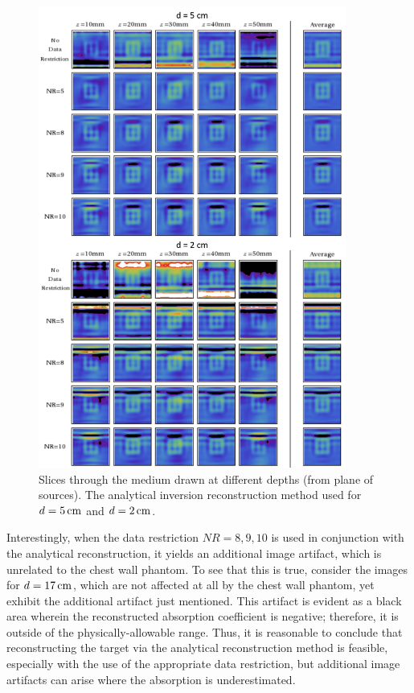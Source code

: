 \begin{figure}[htbp]
\centering
\includegraphics[width=0.9\textwidth]{./figures/3_Chestwall/anaslices.png}
\caption[Analytical reconstruction images at various depths]{\label{fig:slices_analytical}
Slices through the medium drawn at different depths (from plane of sources). The analytical inversion reconstruction method used for $d=5\,\rm{cm}$ and $d=2\,\rm{cm}$.}
\end{figure}
Interestingly, when the data restriction $NR = 8, 9, 10$ is used in conjunction with the analytical reconstruction, it yields an additional image artifact, which is unrelated to the chest wall phantom. To see that this is true, consider the images for $d=17\,{\rm cm}$, which are not affected at all by the chest wall phantom, yet exhibit the additional artifact just mentioned. This artifact is evident as a black area wherein the reconstructed absorption coefficient is negative; therefore, it is outside of the physically-allowable range. Thus, it is reasonable to conclude that reconstructing the target via the analytical reconstruction method is feasible, especially with the use of the appropriate data restriction, but additional image artifacts can arise where the absorption is underestimated. 

